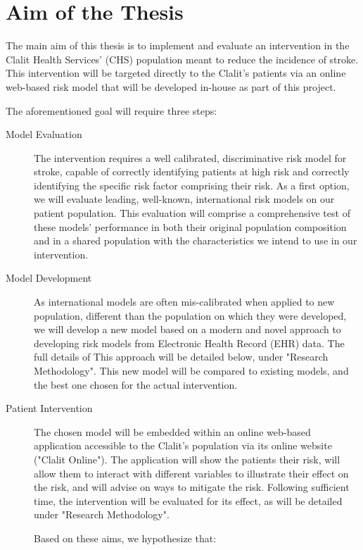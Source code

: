 \documentclass[a4paper,12pt]{article}
\begin{document}
	
	\section{Aim of the Thesis}
	The main aim of this thesis is to implement and evaluate an intervention in the Clalit Health Services' (CHS) population meant to reduce the incidence of stroke. This intervention will be targeted directly to the Clalit's patients via an online web-based risk model that will be developed in-house as part of this project.
	
	The aforementioned goal will require three steps:
	\begin{description}
		
		\item[Model Evaluation] The intervention requires a well calibrated, discriminative risk model for stroke, capable of correctly identifying patients at high risk and correctly identifying the specific risk factor comprising their risk. As a first option, we will evaluate leading, well-known, international risk models on our patient population. This evaluation will comprise a comprehensive test of these models' performance in both their original population composition and in a shared population with the characteristics we intend to use in our intervention.
		
		\item[Model Development] As international models are often mis-calibrated when applied to new population, different than the population on which they were developed, we will develop a new model based on a modern and novel approach to developing risk models from Electronic Health Record (EHR) data. The full details of This approach will be detailed below, under "Research Methodology". This new model will be compared to existing models, and the best one chosen for the actual intervention.
		
		\item[Patient Intervention] The chosen model will be embedded within an online web-based application accessible to the Clalit's population via its online website ("Clalit Online"). The application will show the patients their risk, will allow them to interact with different variables to illustrate their effect on the risk, and will advise on ways to mitigate the risk. Following sufficient time, the intervention will be evaluated for its effect, as will be detailed under "Research Methodology".
		
		Based on these aims, we hypothesize that:
		\begin{enumerate}
			

\end{enumerate}
\end{description}
\end{document}
